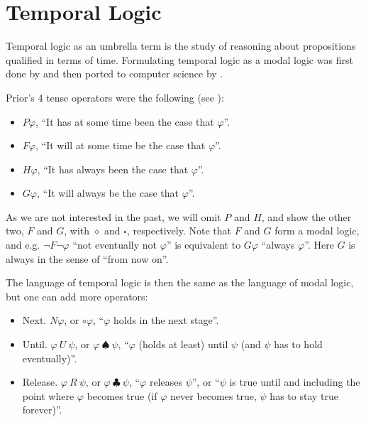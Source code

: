 \section{Temporal Logic}

Temporal logic as an umbrella term is the study of reasoning about propositions qualified in terms of time. Formulating temporal logic as a modal logic was first done by \cite{PRIOR1957,PRIOR1967,prior1968papers} and then ported to computer science by \cite{DBLP:conf/focs/Pnueli77}.

Prior's 4 tense operators were the following (see \cite{sep-logic-temporal}):
\begin{itemize}
    \item $P\varphi$, ``It has at some time been the case that $\varphi$''.
    \item $F\varphi$, ``It will at some time be the case that $\varphi$''.
    \item $H\varphi$, ``It has always been the case that $\varphi$''.
    \item $G\varphi$, ``It will always be the case that $\varphi$''.
\end{itemize}

As we are not interested in the past, we will omit $P$ and $H$, and show the other two, $F$ and $G$, with $\diamond$ and $\square$, respectively. Note that $F$ and $G$ form a modal logic, and e.g. $\neg{}F\neg\varphi$ ``not eventually not $\varphi$'' is equivalent to $G\varphi$ ``always $\varphi$''. Here $G$ is always in the sense of ``from now on''.

The language of temporal logic is then the same as the language of modal logic, but one can add more operators:
\begin{itemize}
    \item Next. $N\varphi$, or $\circ\varphi$, ``$\varphi$ holds in the next stage''.
    \item Until. $\varphi~U~\psi$, or $\varphi~\spadesuit~\psi$, ``$\varphi$ (holds at least) until $\psi$ (and $\psi$ has to hold eventually)''.
    \item Release. $\varphi~R~\psi$, or $\varphi~\clubsuit~\psi$, ``$\varphi$ releases $\psi$'', or ``$\psi$ is true until and including the point where $\varphi$ becomes true (if $\varphi$ never becomes true, $\psi$ has to stay true forever)''.
\end{itemize}
